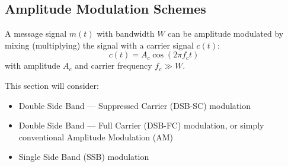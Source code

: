 \documentclass{article}
\begin{document}
\subsection{Amplitude Modulation Schemes}
A message signal \(m\left( t \right)\) with bandwidth \(W\) can be
amplitude modulated by mixing (multiplying) the signal with a carrier
signal \(c\left( t \right)\):
\begin{equation*}
    c\left( t \right) = A_c \cos{\left( 2 \pi f_c t \right)}
\end{equation*}
with amplitude \(A_c\) and carrier frequency \(f_c \gg W\).

This section will consider:
\begin{itemize}
    \item Double Side Band --- Suppressed Carrier (DSB-SC) modulation
    \item Double Side Band --- Full Carrier (DSB-FC) modulation, or
          simply conventional Amplitude Modulation (AM)
    \item Single Side Band (SSB) modulation
\end{itemize}
\end{document}
